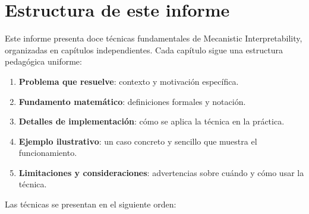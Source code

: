 \documentclass[11pt,a4paper]{report}
\theoremstyle{definition}
\begin{document}
\section{Estructura de este informe}

Este informe presenta doce técnicas fundamentales de Mecanistic Interpretability, organizadas en capítulos independientes. Cada capítulo sigue una estructura pedagógica uniforme:

\begin{enumerate}
    \item \textbf{Problema que resuelve}: contexto y motivación específica.
    \item \textbf{Fundamento matemático}: definiciones formales y notación.
    \item \textbf{Detalles de implementación}: cómo se aplica la técnica en la práctica.
    \item \textbf{Ejemplo ilustrativo}: un caso concreto y sencillo que muestra el funcionamiento.
    \item \textbf{Limitaciones y consideraciones}: advertencias sobre cuándo y cómo usar la técnica.
\end{enumerate}

Las técnicas se presentan en el siguiente orden:
\end{document}
